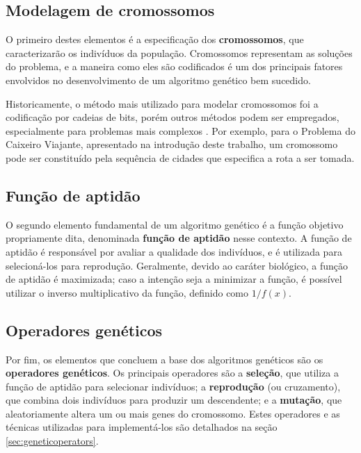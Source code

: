 \documentclass[12pt]{article}
\begin{document}
\subsection{Modelagem de cromossomos} \label{sec:chromosomes}

O primeiro destes elementos é a especificação dos \textbf{cromossomos}, que caracterizarão os indivíduos da população. Cromossomos representam as soluções do problema, e a maneira como eles são codificados é um dos principais fatores envolvidos no desenvolvimento de um algoritmo genético bem sucedido.

Historicamente, o método mais utilizado para modelar cromossomos foi a codificação por cadeias de bits, porém outros métodos podem ser empregados, especialmente para problemas mais complexos \cite{Mitchell1998}. Por exemplo, para o Problema do Caixeiro Viajante, apresentado na introdução deste trabalho, um cromossomo pode ser constituído pela sequência de cidades que especifica a rota a ser tomada.

\subsection{Função de aptidão} \label{sec:fitnessfunction}

O segundo elemento fundamental de um algoritmo genético é a função objetivo propriamente dita, denominada \textbf{função de aptidão} nesse contexto. A função de aptidão é responsável por avaliar a qualidade dos indivíduos, e é utilizada para selecioná-los para reprodução. Geralmente, devido ao caráter biológico, a função de aptidão é maximizada; caso a intenção seja a minimizar a função, é possível utilizar o inverso multiplicativo da função, definido como $1 / f(x)$.

\subsection{Operadores genéticos} \label{sec:operatorsbrief}

Por fim, os elementos que concluem a base dos algoritmos genéticos são os \textbf{operadores genéticos}. Os principais operadores são a \textbf{seleção}, que utiliza a função de aptidão para selecionar indivíduos; a \textbf{reprodução} (ou cruzamento), que combina dois indivíduos para produzir um descendente; e a \textbf{mutação}, que aleatoriamente altera um ou mais genes do cromossomo. Estes operadores e as técnicas utilizadas para implementá-los são detalhados na seção \ref{sec:geneticoperators}.
\end{document}
